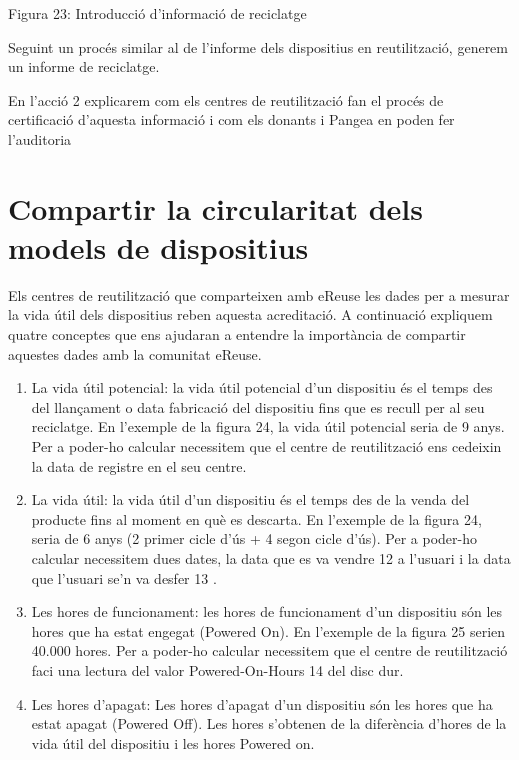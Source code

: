 \documentclass[
]{book}
\begin{document}
Figura 23: Introducció d'informació de reciclatge

Seguint un procés similar al de l'informe dels dispositius en reutilització, generem un informe
de reciclatge.

En l'acció 2 explicarem com els centres de reutilització fan el procés de certificació d'aquesta
informació i com els donants i Pangea en poden fer l'auditoria

\hypertarget{compartir-la-circularitat-dels-models-de-dispositius}{%
\section{Compartir la circularitat dels models de dispositius}\label{compartir-la-circularitat-dels-models-de-dispositius}}

Els centres de reutilització que comparteixen amb eReuse les dades per a mesurar la vida útil dels dispositius reben aquesta acreditació. A continuació expliquem quatre conceptes que ens ajudaran a entendre la importància de compartir aquestes dades amb la comunitat eReuse.

\begin{enumerate}
\def\labelenumi{\arabic{enumi}.}
\item
  La vida útil potencial: la vida útil potencial d'un dispositiu és el temps des del llançament o data fabricació del dispositiu fins que es recull per al seu reciclatge. En l'exemple de la figura 24, la vida útil potencial seria de 9 anys. Per a poder-ho calcular necessitem que el centre de reutilització ens cedeixin la data de registre en el seu centre.
\item
  La vida útil: la vida útil d'un dispositiu és el temps des de la venda del producte fins al moment en què es descarta. En l'exemple de la figura 24, seria de 6 anys (2 primer cicle d'ús + 4 segon cicle d'ús). Per a poder-ho calcular necessitem dues dates, la data que es va vendre 12 a l'usuari i la data que l'usuari se'n va desfer 13 .
\item
  Les hores de funcionament: les hores de funcionament d'un dispositiu són les hores que ha estat engegat (Powered On). En l'exemple de la figura 25 serien 40.000 hores. Per a poder-ho calcular necessitem que el centre de reutilització faci una lectura del
  valor Powered-On-Hours 14 del disc dur.
\item
  Les hores d'apagat: Les hores d'apagat d'un dispositiu són les hores que ha estat apagat (Powered Off). Les hores s'obtenen de la diferència d'hores de la vida útil del dispositiu i les hores Powered on.
\end{enumerate}
\end{document}
